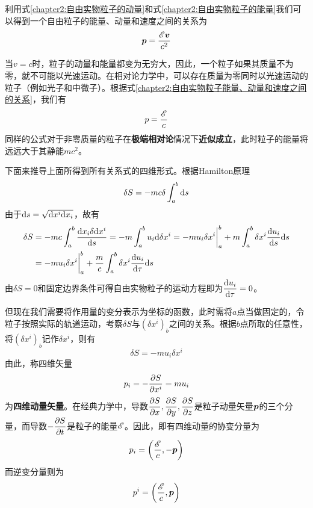利用式\eqref{chapter2:自由实物粒子的动量}和式\eqref{chapter2:自由实物粒子的能量}我们可以得到一个自由粒子的能量、动量和速度之间的关系为
\begin{equation}
	\boldsymbol{p} = \frac{\mathscr{E} \boldsymbol{v}}{c^2}
	\label{chapter2:自由实物粒子能量、动量和速度之间的关系}
\end{equation}

当$v=c$时，粒子的动量和能量都变为无穷大，因此，一个粒子如果其质量不为零，就不可能以光速运动。在相对论力学中，可以存在质量为零同时以光速运动的粒子（例如光子和中微子）。根据式\eqref{chapter2:自由实物粒子能量、动量和速度之间的关系}，我们有
\begin{equation}
	p = \frac{\mathscr{E}}{c}
\end{equation}
同样的公式对于非零质量的粒子在{\bf 极端相对论}情况下{\bf 近似成立}，此时粒子的能量将远远大于其静能$mc^2$。

下面来推导上面所得到所有关系式的四维形式。根据Hamilton原理
\begin{equation*}
	\delta S = -mc\delta\int_a^b \mathrm{d} s
\end{equation*}
由于$\mathrm{d} s = \sqrt{\mathrm{d} x^i\mathrm{d} x_i}$，故有
\begin{align}
	\delta S & = -mc\int_a^b \frac{\mathrm{d} x_i\delta \mathrm{d} x^i}{\mathrm{d} s} = -m\int_a^b u_i\mathrm{d} \delta x^i = -mu_i\delta x^i\bigg|_a^b + m\int_a^b \delta x^i \frac{\mathrm{d} u_i}{\mathrm{d} s}\mathrm{d} s \nonumber \\
	& = -mu_i\delta x^i\bigg|_a^b + \frac{m}{c}\int_a^b \delta x^i \frac{\mathrm{d} u_i}{\mathrm{d} \tau}\mathrm{d} s
	\label{chapter2.section2.1:作用量的变分}
\end{align}
由$\delta S = 0$和固定边界条件可得自由实物粒子的运动方程即为$\dfrac{\mathrm{d} u_i}{\mathrm{d} \tau} = 0$。

但现在我们需要将作用量的变分表示为坐标的函数，此时需将$a$点当做固定的，令粒子按照实际的轨道运动，考察$\delta S$与$(\delta x^i)_b$之间的关系。根据$b$点所取的任意性，将$(\delta x^i)_b$记作$\delta x^i$，则有
\begin{equation}
	\delta S = -mu_i\delta x^i
\end{equation}
由此，称四维矢量
\begin{equation}
	p_i = -\frac{\partial S}{\partial x^i} = mu_i
	\label{chapter2:四维动量矢量}
\end{equation}
为{\bf 四维动量矢量}。在经典力学中，导数$\dfrac{\partial S}{\partial x}, \dfrac{\partial S}{\partial y}, \dfrac{\partial S}{\partial z}$是粒子动量矢量$\boldsymbol{p}$的三个分量，而导数$-\dfrac{\partial S}{\partial t}$是粒子的能量$\mathscr{E}$。因此，即有四维动量的协变分量为
\begin{equation}
	p_i = \left(\frac{\mathscr{E}}{c},-\boldsymbol{p}\right)
	\label{chapter2:四维动量矢量的协变分量}
\end{equation}
而逆变分量则为
\begin{equation}
	p^i = \left(\frac{\mathscr{E}}{c},\boldsymbol{p}\right)
	\label{chapter2:四维动量矢量的逆变分量}
\end{equation}

